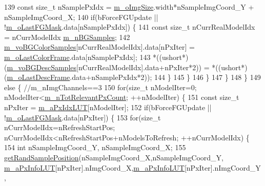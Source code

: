 \begin{DoxyCode}
139                     \textcolor{keyword}{const} \textcolor{keywordtype}{size\_t} nSamplePxIdx = \mbox{\hyperlink{class_background_subtractor_l_b_s_p_a732d5e6ae35fb0e858cadb3af5ce08a2}{m\_oImgSize}}.width*nSampleImgCoord\_Y + 
      nSampleImgCoord\_X;
140                     \textcolor{keywordflow}{if}(bForceFGUpdate || !\mbox{\hyperlink{class_background_subtractor_l_b_s_p_adb6dc0af596c5592c91f9d8faa5c8a4b}{m\_oLastFGMask}}.data[nSamplePxIdx]) \{
141                         \textcolor{keyword}{const} \textcolor{keywordtype}{size\_t} nCurrRealModelIdx = nCurrModelIdx%
      \mbox{\hyperlink{class_background_subtractor_l_o_b_s_t_e_r_a20c53540b952d608d849a305fd5eed89}{m\_nBGSamples}};
142                         \mbox{\hyperlink{class_background_subtractor_l_o_b_s_t_e_r_ac981b39f8ae7b28d3e4326d8e6be6332}{m\_voBGColorSamples}}[nCurrRealModelIdx].data[nPxIter] = 
      \mbox{\hyperlink{class_background_subtractor_l_b_s_p_ab1dc003792ab1d0b881a6fd10e0e29b3}{m\_oLastColorFrame}}.data[nSamplePxIdx];
143                         *((ushort*)(\mbox{\hyperlink{class_background_subtractor_l_o_b_s_t_e_r_a3c49866ae652423b2173215957907d04}{m\_voBGDescSamples}}[nCurrRealModelIdx].data+nPxIter*2)) 
      = *((ushort*)(\mbox{\hyperlink{class_background_subtractor_l_b_s_p_a9c637c0b87cac495887295690d83ba13}{m\_oLastDescFrame}}.data+nSamplePxIdx*2));
144                     \}
145                 \}
146             \}
147         \}
148     \}
149     \textcolor{keywordflow}{else} \{ \textcolor{comment}{//m\_nImgChannels==3}
150         \textcolor{keywordflow}{for}(\textcolor{keywordtype}{size\_t} nModelIter=0; nModelIter<\mbox{\hyperlink{class_background_subtractor_l_b_s_p_ac3b54f4d2dfa3a576475214f26501d85}{m\_nTotRelevantPxCount}}; ++nModelIter) \{
151             \textcolor{keyword}{const} \textcolor{keywordtype}{size\_t} nPxIter = \mbox{\hyperlink{class_background_subtractor_l_b_s_p_a06b4f0d3f24fa08bccd3c9eca085713e}{m\_aPxIdxLUT}}[nModelIter];
152             \textcolor{keywordflow}{if}(bForceFGUpdate || !\mbox{\hyperlink{class_background_subtractor_l_b_s_p_adb6dc0af596c5592c91f9d8faa5c8a4b}{m\_oLastFGMask}}.data[nPxIter]) \{
153                 \textcolor{keywordflow}{for}(\textcolor{keywordtype}{size\_t} nCurrModelIdx=nRefreshStartPos; nCurrModelIdx<nRefreshStartPos+nModelsToRefresh;
       ++nCurrModelIdx) \{
154                     \textcolor{keywordtype}{int} nSampleImgCoord\_Y, nSampleImgCoord\_X;
155                     \mbox{\hyperlink{_rand_utils_8h_aad1feb1fa9a8e94c8fac60b9a01e1a5b}{getRandSamplePosition}}(nSampleImgCoord\_X,nSampleImgCoord\_Y,
      \mbox{\hyperlink{class_background_subtractor_l_b_s_p_a74e73d4832ccdef652d93756582024db}{m\_aPxInfoLUT}}[nPxIter].nImgCoord\_X,\mbox{\hyperlink{class_background_subtractor_l_b_s_p_a74e73d4832ccdef652d93756582024db}{m\_aPxInfoLUT}}[nPxIter].nImgCoord\_Y,

\end{DoxyCode}
